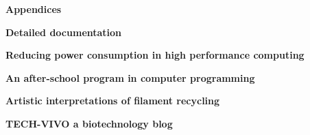 \documentclass{report}
\begin{document}
\begin{outline}
\begin{outline}
  \end{outline}
  \item {\bf Appendices}
  \begin{outline}
    \item {\bf Detailed documentation } \\
    \item {\bf Reducing power consumption in high performance computing } \\
    \item {\bf An after-school program in computer programming } \\
    \item {\bf Artistic interpretations of filament recycling } \\
    \item {\bf TECH-VIVO a biotechnology blog } \\
      
  \end{outline}
\end{outline}
\end{document}

